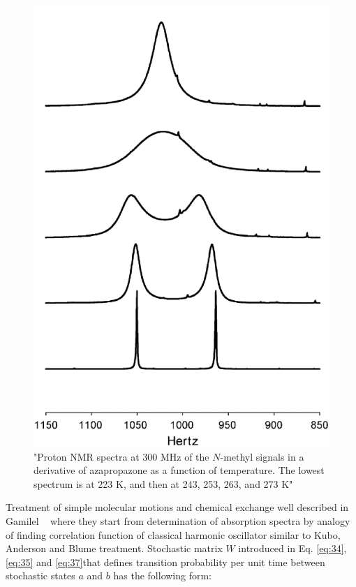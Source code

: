 \begin{figure}[h!]
\begin{center}
\includegraphics[scale=0.5]{figures/chap2/methyldat.eps}
\caption{"Proton NMR spectra at 300 MHz of the $N$-methyl signals in a
derivative of azapropazone as a function of temperature. The lowest spectrum is at 223 K, and then
at 243, 253, 263, and 273 K"~\cite{Bain200363}}
\label{figure:datamet}
\end{center}
\end{figure}  
Treatment of simple molecular motions and chemical exchange well described in Gamilel ~\cite{gamilel} where they start from determination of absorption spectra by analogy of finding correlation function of classical harmonic oscillator similar to Kubo, Anderson and Blume treatment. Stochastic matrix $W$ introduced in Eq. \ref{eq:34},\ref{eq:35} and \ref{eq:37}that defines transition probability per unit time between stochastic states $a$ and $b$ has the following form:  
